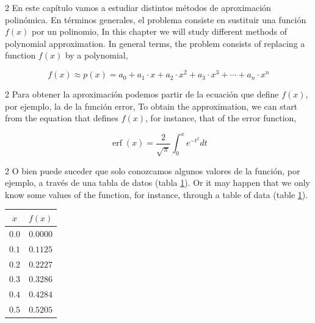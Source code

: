 \sloppy
\begin{paracol}{2}
En este capítulo vamos a estudiar distintos métodos de aproximación polinómica. En términos generales, el problema consiste en sustituir una función $f(x)$ por un polinomio,
\switchcolumn
In this chapter we will study different methods of polynomial approximation. In general terms, the problem consists of replacing a function $f(x)$ by a polynomial,
\end{paracol}
\begin{equation*}
f(x)\approx p(x)=a_0+a_1\cdot x+a_2\cdot x^2+a_3\cdot x^3+\cdots +a_n \cdot x^n
\end{equation*}
\begin{paracol}{2}
Para obtener la aproximación podemos partir de la ecuación que define $f(x)$, por ejemplo, la de la función error,
\switchcolumn
To obtain the approximation, we can start from the equation that defines $f(x)$, for instance, that of the error function,
\end{paracol}
\begin{equation*}
\operatorname{erf}(x)=\frac{2}{\sqrt{\pi}}\int_0^x e^{-t^2}dt
\end{equation*}
\begin{paracol}{2}
O bien puede suceder que solo conozcamos algunos valores de la función, por ejemplo, a través de una tabla de datos (tabla \ref{tpuntos2}).
\switchcolumn
Or it may happen that we only know some values of the function, for instance, through a table of data (table \ref{tpuntos2}).
\end{paracol}
\begin{table}[h]
\centering
\begin{tabular}{c|c}
$x$&$f(x)$\\
\hline
$0.0$& $0.0000$\\
$0.1$&$0.1125$\\
$0.2$&$0.2227$\\
$0.3$&$0.3286$\\
$0.4$&$0.4284$\\
$0.5$&$0.5205$\\
\end{tabular}
\label{tpuntos2}
\end{table}

